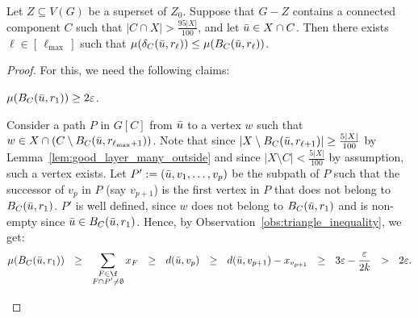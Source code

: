 \begin{lemma}\label{lem:good_layer_cost_and_gain}
    Let $Z \subseteq V(G)$ be a superset of $Z_0$. Suppose that $G - Z$ contains a connected component $C$ such that $|C \cap X| > \frac{95|X|}{100}$, and let $\Bar{u} \in X \cap C$. Then there exists $\ell \in [\,\ell_{\max}\,]$ such that $\mu(\delta_C(\Bar{u}, r_\ell)) \leq \mu(B_C(\Bar{u}, r_\ell))$.
\end{lemma}
\begin{proof}
    For this, we need the following claims:
    
    \begin{claim}\label{claim:inner_ball_has_non_zero_measure}
        $\mu(B_C(\Bar{u}, r_1)) \geq 2\varepsilon$.
    \end{claim}
    \begin{claimproof}
        Consider a path $P$ in $G[C]$ from $\Bar{u}$ to a vertex $w$ such that $w \in X\cap (C\setminus B_C(\Bar{u}, r_{\ell_{\max} + 1}))$. Note that since $| X \setminus B_C(\Bar{u}, r_{\ell+1}) | \geq \frac{5|X|}{100}$ by Lemma~\ref{lem:good_layer_many_outside} and since $|X \setminus C| < \frac{5|X|}{100}$ by assumption, such a vertex exists. %
        Let $P' := (\Bar{u},v_1,\dots,v_p)$ be the subpath of $P$ such that the successor of $v_p$ in $P$ (say $v_{p+1}$) is the first vertex in $P$ that does not belong to $B_C(\Bar{u}, r_1)$. $P'$ is well defined, since $w$ does not belong to $B_C(\Bar{u}, r_1)$ and is non-empty since $\Bar{u} \in B_C(\Bar{u}, r_1)$. %
        Hence, by Observation~\ref{obs:triangle_inequality}, we get:
        $$
        \mu(B_C(\Bar{u}, r_1)) 
        \ \ \geq \ \ \sum_{\substack{F \in \f \\ F \cap P' \neq \emptyset}} x_F 
        \ \ \geq \ \ d(\Bar{u}, v_p) 
        \ \ \geq \ \ d(\Bar{u}, v_{p+1}) - x_{v_{p+1}}
        \ \ \geq \ \ 3\varepsilon - \frac{\varepsilon}{2k}
        \ \ > \ \ 2\varepsilon.
        $$ 
    \end{claimproof}
    

\end{proof}
